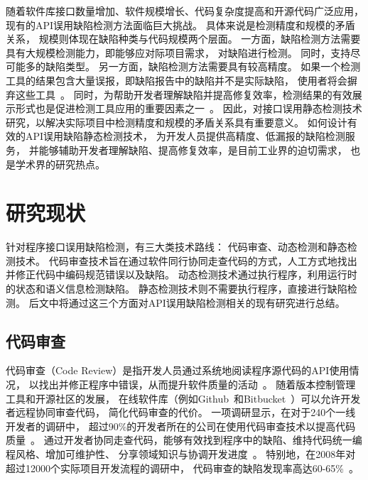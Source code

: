 随着软件库接口数量增加、软件规模增长、代码复杂度提高和开源代码广泛应用，
现有的API误用缺陷检测方法面临巨大挑战。
具体来说是检测精度和规模的矛盾关系，
规模则体现在缺陷种类与代码规模两个层面。
一方面，缺陷检测方法需要具有大规模检测能力，即能够应对际项目需求，
对缺陷进行检测。
同时，支持尽可能多的缺陷类型。
另一方面，缺陷检测方法需要具有较高精度。
如果一个检测工具的结果包含大量误报，即缺陷报告中的缺陷并不是实际缺陷，
使用者将会摒弃这些工具~\cite{10-acm-precision}。
同时，为帮助开发者理解缺陷并提高修复效率，检测结果的有效展示形式也是促进检测工具应用的重要因素之一~\cite{13-icse-donotuse}。
因此，对接口误用静态检测技术研究，以解决实际项目中检测精度和规模的矛盾关系具有重要意义。
如何设计有效的API误用缺陷静态检测技术，
为开发人员提供高精度、低漏报的缺陷检测服务，
并能够辅助开发者理解缺陷、提高修复效率，是目前工业界的迫切需求，
也是学术界的研究热点。






\section{研究现状}
针对程序接口误用缺陷检测，有三大类技术路线：
代码审查、动态检测和静态检测技术。
代码审查技术旨在通过软件同行协同走查代码的方式，人工方式地找出并修正代码中编码规范错误以及缺陷。
动态检测技术通过执行程序，利用运行时的状态和语义信息检测缺陷。
静态检测技术则不需要执行程序，直接进行缺陷检测。
后文中将通过这三个方面对API误用缺陷检测相关的现有研究进行总结。

\subsection{代码审查}
代码审查（Code Review）是指开发人员通过系统地阅读程序源代码的API使用情况，
以找出并修正程序中错误，从而提升软件质量的活动~\cite{code-review}。
随着版本控制管理工具和开源社区的发展，
在线软件库（例如Github~\cite{github}和Bitbucket~\cite{bitbucket}）可以允许开发者远程协同审查代码，
简化代码审查的代价。
一项调研显示，在对于240个一线开发者的调研中，
超过90\%的开发者所在的公司在使用代码审查技术以提高代码质量~\cite{17-profes-code-review}。
通过开发者协同走查代码，能够有效找到程序中的缺陷、维持代码统一编程风格、增加可维护性、
分享领域知识与协调开发进度~\cite{13-icse-code-review}。
特别地，在2008年对超过12000个实际项目开发流程的调研中，
代码审查的缺陷发现率高达60-65\%~\cite{08-code-review}。

